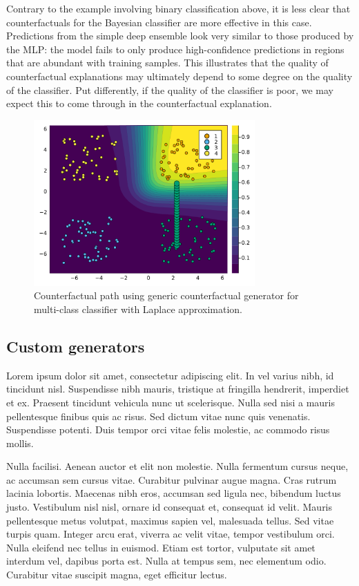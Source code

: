 \documentclass[
  letterpaper,
  DIV=11,
  numbers=noendperiod]{scrartcl}
\begin{document}
Contrary to the example involving binary classification above, it is
less clear that counterfactuals for the Bayesian classifier are more
effective in this case. Predictions from the simple deep ensemble look
very similar to those produced by the MLP: the model fails to only
produce high-confidence predictions in regions that are abundant with
training samples. This illustrates that the quality of counterfactual
explanations may ultimately depend to some degree on the quality of the
classifier. Put differently, if the quality of the classifier is poor,
we may expect this to come through in the counterfactual explanation.

\begin{figure}

{\centering \includegraphics[width=3.33333in,height=2.5in]{www/ce_multi_ensemble.png}

}

\caption{\label{fig-multi-ensemble}Counterfactual path using generic
counterfactual generator for multi-class classifier with Laplace
approximation.}

\end{figure}

\hypertarget{custom-generators}{%
\subsection{Custom generators}\label{custom-generators}}

Lorem ipsum dolor sit amet, consectetur adipiscing elit. In vel varius
nibh, id tincidunt nisl. Suspendisse nibh mauris, tristique at fringilla
hendrerit, imperdiet et ex. Praesent tincidunt vehicula nunc ut
scelerisque. Nulla sed nisi a mauris pellentesque finibus quis ac risus.
Sed dictum vitae nunc quis venenatis. Suspendisse potenti. Duis tempor
orci vitae felis molestie, ac commodo risus mollis.

Nulla facilisi. Aenean auctor et elit non molestie. Nulla fermentum
cursus neque, ac accumsan sem cursus vitae. Curabitur pulvinar augue
magna. Cras rutrum lacinia lobortis. Maecenas nibh eros, accumsan sed
ligula nec, bibendum luctus justo. Vestibulum nisl nisl, ornare id
consequat et, consequat id velit. Mauris pellentesque metus volutpat,
maximus sapien vel, malesuada tellus. Sed vitae turpis quam. Integer
arcu erat, viverra ac velit vitae, tempor vestibulum orci. Nulla
eleifend nec tellus in euismod. Etiam est tortor, vulputate sit amet
interdum vel, dapibus porta est. Nulla at tempus sem, nec elementum
odio. Curabitur vitae suscipit magna, eget efficitur lectus.
\end{document}
